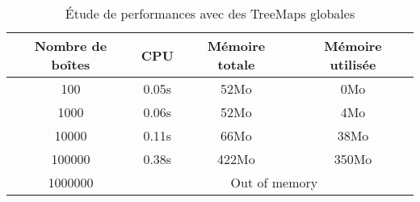 \begin{table}[h]
  \centering
\begin{tabular}{|c|c|c|c|}
\hline
Nombre de boîtes & CPU & Mémoire totale & Mémoire utilisée\\
\hline
100 & 0.05s & 52Mo & 0Mo\\
\hline
1000 & 0.06s & 52Mo & 4Mo\\
\hline
10000 & 0.11s & 66Mo & 38Mo\\
\hline
100000 & 0.38s & 422Mo & 350Mo\\
\hline
1000000 & \multicolumn{3}{|c|}{Out of memory}\\
\hline
\end{tabular}
\caption{Étude de performances avec des TreeMaps globales} 
\label{tab:treemapglobal}
\end{table}





